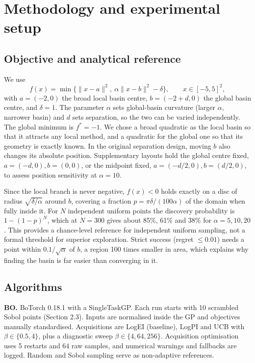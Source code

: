 \documentclass[11pt,a4paper]{article}
\newcommand{\norm}[1]{\lVert #1\rVert}
\begin{document}
\section{Methodology and experimental setup}

\subsection{Objective and analytical reference}\label{sec:objective}
We use
\[
f(x)=\min\bigl\{\norm{x-a}^2,\ \alpha\norm{x-b}^2-\delta\bigr\},\qquad x\in[-5,5]^2,
\]
with $a=(-2,0)$ the broad local basin centre, $b=(-2+d,0)$ the global basin centre, and $\delta=1$. The parameter $\alpha$ sets global-basin curvature (larger $\alpha$, narrower basin) and $d$ sets separation, so the two can be varied independently. The global minimum is $f^*=-1$. We chose a broad quadratic as the local basin so that it attracts any local method, and a quadratic for the global one so that its geometry is exactly known. In the original separation design, moving $b$ also changes its absolute position. Supplementary layouts hold the global centre fixed, $a=(-d,0), b=(0,0)$, or the midpoint fixed, $a=(-d/2,0), b=(d/2,0)$, to assess position sensitivity at $\alpha=10$.

Since the local branch is never negative, $f(x)<0$ holds exactly on a disc of radius $\sqrt{\delta/\alpha}$ around $b$, covering a fraction $p=\pi\delta/(100\alpha)$ of the domain when fully inside it. For $N$ independent uniform points the discovery probability is $1-(1-p)^N$, which at $N=300$ gives about 85\%, 61\% and 38\% for $\alpha=5,10,20$. This provides a chance-level reference for independent uniform sampling, not a formal threshold for superior exploration. Strict success (regret $\le 0.01$) needs a point within $0.1/\sqrt{\alpha}$ of $b$, a region 100 times smaller in area, which explains why finding the basin is far easier than converging in it.

\subsection{Algorithms}\label{sec:algorithms}
\textbf{BO.} BoTorch 0.18.1 with a SingleTaskGP. Each run starts with 10 scrambled Sobol points (Section 2.3). Inputs are normalised inside the GP and objectives manually standardised. Acquisitions are LogEI (baseline), LogPI and UCB with $\beta\in\{0.5,4\}$, plus a diagnostic sweep $\beta\in\{4,64,256\}$. Acquisition optimisation uses 5 restarts and 64 raw samples, and numerical warnings and fallbacks are logged. Random and Sobol sampling serve as non-adaptive references.
\end{document}
